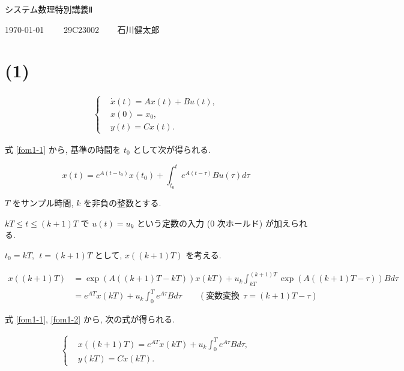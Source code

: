 \documentclass[10pt, fleqn, dvipdfmx]{article}
\begin{document}
\begin{center}
	{\Huge システム数理特別講義Ⅱ}
\end{center}

\begin{flushright}
	{\Large \today ~~~~ 29C23002 ~~~ 石川健太郎}
\end{flushright}

\section*{(1)}

\begin{align}
	\left\{
	\begin{aligned}
		 & \dot{x}(t) = A x(t) + B u(t), \\
		 & x(0) = x_0,                   \\
		 & y(t) = C x(t).
	\end{aligned}
	\right.
	\label{fom1-1}
\end{align}

式 \eqref{fom1-1} から, 基準の時間を $t_0$ として次が得られる.

\begin{equation}
	x(t) = e^{A (t - t_0)} x(t_0) + \int_{t_0}^t e^{A (t - \tau)} B u (\tau) d\tau
\end{equation}

$T$ をサンプル時間, $k$ を非負の整数とする.

$kT \leq t \leq (k+1)T$ で $u(t) = u_k$ という定数の入力 (0 次ホールド) が加えられる.

$t_0 = kT, ~~ t = (k+1)T$ として, $x((k+1)T)$ を考える.

\begin{align}
	x((k+1)T)
	 & = \exp \left( A ((k+1)T - kT) \right) x(kT)
	+ u_k \int_{kT}^{(k+1)T} \exp\left( A ((k+1)T - \tau) \right) B d\tau \nonumber \\
	 & = e^{A T} x(kT) + u_k \int_0^T e^{A \tau} B d\tau
	\qquad \left( \text{変数変換} ~~ \tau = (k+1)T - \tau \right)
	\label{fom1-2}
\end{align}

式 \eqref{fom1-1}, \eqref{fom1-2} から, 次の式が得られる.

\begin{align}
	\left\{
	\begin{aligned}
		 & x((k+1)T) = e^{A T} x(kT) + u_k \int_0^T e^{A \tau} B d\tau, \\
		 & y(kT) = C x(kT).
	\end{aligned}
	\right.
	\label{fom1-3}
\end{align}
\end{document}
